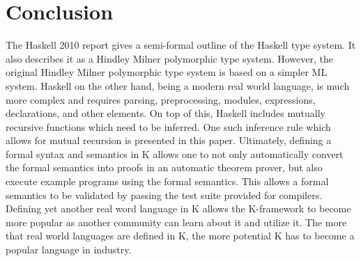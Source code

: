 \chapter{Conclusion}

The Haskell 2010 report gives a semi-formal outline of the Haskell type system. It also describes it as a Hindley Milner polymorphic type system. However, the original Hindley Milner polymorphic type system is based on a simpler ML system. Haskell on the other hand, being a modern real world language, is much more complex and requires parsing, preprocessing, modules, expressions, declarations, and other elements. On top of this, Haskell includes mutually recursive functions which need to be inferred. One such inference rule which allows for mutual recursion is presented in this paper. Ultimately, defining a formal syntax and semantics in K allows one to not only automatically convert the formal semantics into proofs in an automatic theorem prover, but also execute example programs using the formal semantics. This allows a formal semantics to be validated by passing the test suite provided for compilers. Defining yet another real word language in K allows the K-framework to become more popular as another community can learn about it and utilize it. The more that real world languages are defined in K, the more potential K has to become a popular language in industry.